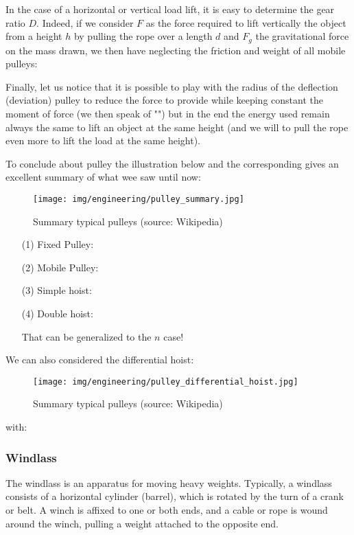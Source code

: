 	In the case of a horizontal or vertical load lift, it is easy to determine the gear ratio $D$. Indeed, if we consider $F$ as  the force required to lift vertically the object from a height $h$ by pulling the rope over a length $d$ and $F_g$ the gravitational force on the mass drawn, we then have neglecting the friction and weight of all mobile pulleys:
	
	Finally, let us notice that it is possible to play with the radius of the deflection (deviation) pulley to reduce the force to provide while keeping constant the moment of force (we then speak of "") but in the end the energy used remain always the same to lift an object at the same height (and we will to pull the rope even more to lift the load at the same height).
	
	\pagebreak
	To conclude about pulley the illustration below and the corresponding gives an excellent summary of what wee saw until now:
	\begin{figure}[H]
		\centering
		\texttt{[image: img/engineering/pulley\_summary.jpg]}
		\caption{Summary typical pulleys (source: Wikipedia)}
	\end{figure}
	\begin{enumerate}
		\item[(1)] Fixed Pulley:
		
	
		\item[(2)] Mobile Pulley:
		
		
		\item[(3)] Simple hoist:
		

		\item[(4)] Double hoist:
		
		That can be generalized to the $n$ case!
	\end{enumerate}
	
	\pagebreak
	We can also considered the differential hoist:
	\begin{figure}[H]
		\centering
		\texttt{[image: img/engineering/pulley\_differential\_hoist.jpg]}
		\caption{Summary typical pulleys (source: Wikipedia)}
	\end{figure}
	with:
	
	
	\subsubsection{Windlass}
	The windlass is an apparatus for moving heavy weights. Typically, a windlass consists of a horizontal cylinder (barrel), which is rotated by the turn of a crank or belt. A winch is affixed to one or both ends, and a cable or rope is wound around the winch, pulling a weight attached to the opposite end.
	
